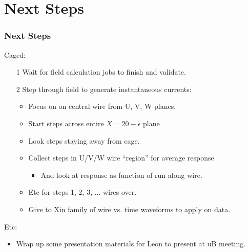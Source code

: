 \documentclass[xcolor=dvipsnames]{beamer}
\begin{document}
\section{Next Steps}
\begin{frame}
  \frametitle{Next Steps}
  
  Caged:
  \begin{itemize}
  \item[1] Wait for field calculation jobs to finish and validate.
  \item[2] Step through field to generate instantaneous currents:
    \begin{itemize}
    \item Focus on on central wire from U, V, W planes.
    \item Start steps across entire $X=20-\epsilon$ plane
    \item Look steps staying away from cage.
    \item Collect steps in U/V/W wire ``region'' for average response
      \begin{itemize}
      \item And look at response as function of run along wire.
      \end{itemize}
    \item Etc for steps 1, 2, 3, ... wires over.
    \item Give to Xin family of wire vs. time waveforms to apply on data.
    \end{itemize}
  \end{itemize}
  Etc:
  \begin{itemize}
  \item Wrap up some presentation materials for Leon to present at uB meeting.
  \end{itemize}

\end{frame}
\end{document}
